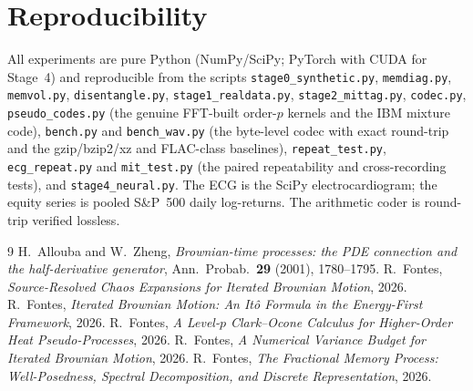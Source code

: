 \documentclass[11pt,reqno]{amsart}
\theoremstyle{plain}
\theoremstyle{definition}
\theoremstyle{remark}
\begin{document}
\section*{Reproducibility}
All experiments are pure Python (NumPy/SciPy; PyTorch with CUDA for
Stage~4) and reproducible from the scripts \texttt{stage0\_synthetic.py},
\texttt{memdiag.py}, \texttt{memvol.py}, \texttt{disentangle.py},
\texttt{stage1\_realdata.py}, \texttt{stage2\_mittag.py}, \texttt{codec.py},
\texttt{pseudo\_codes.py} (the genuine FFT-built order-$p$ kernels and the IBM
mixture code), \texttt{bench.py} and \texttt{bench\_wav.py} (the byte-level
codec with exact round-trip and the gzip/bzip2/xz and FLAC-class baselines),
\texttt{repeat\_test.py}, \texttt{ecg\_repeat.py} and \texttt{mit\_test.py} (the
paired repeatability and cross-recording tests), and \texttt{stage4\_neural.py}. The ECG is the SciPy electrocardiogram; the equity
series is pooled S\&P~500 daily log-returns. The arithmetic coder is
round-trip verified lossless.

\begin{thebibliography}{9}
 H.~Allouba and W.~Zheng,
  \emph{Brownian-time processes: the PDE connection and the half-derivative
  generator}, Ann.\ Probab.\ \textbf{29} (2001), 1780--1795.
 R.~Fontes,
  \emph{Source-Resolved Chaos Expansions for Iterated Brownian Motion}, 2026.
 R.~Fontes,
  \emph{Iterated Brownian Motion: An It\^o Formula in the Energy-First
  Framework}, 2026.
 R.~Fontes,
  \emph{A Level-$p$ Clark--Ocone Calculus for Higher-Order Heat
  Pseudo-Processes}, 2026.
 R.~Fontes,
  \emph{A Numerical Variance Budget for Iterated Brownian Motion}, 2026.
 R.~Fontes,
  \emph{The Fractional Memory Process: Well-Posedness, Spectral Decomposition,
  and Discrete Representation}, 2026.
\end{thebibliography}
\end{document}
